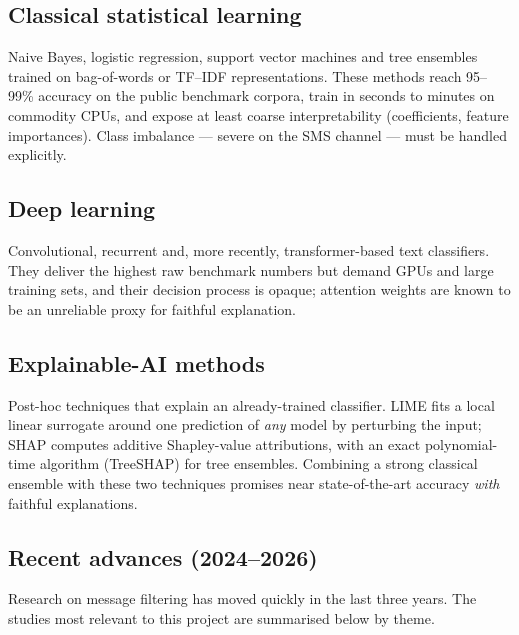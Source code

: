 \documentclass[12pt,a4paper]{report}
\begin{document}
\subsection{Classical statistical learning}

Naive Bayes, logistic regression, support vector machines and tree ensembles
trained on bag-of-words or TF--IDF representations. These methods reach
95--99\% accuracy on the public benchmark corpora, train in seconds to
minutes on commodity CPUs, and expose at least coarse interpretability
(coefficients, feature importances). Class imbalance --- severe on the SMS
channel --- must be handled explicitly.

\subsection{Deep learning}

Convolutional, recurrent and, more recently, transformer-based text
classifiers. They deliver the highest raw benchmark numbers but demand GPUs
and large training sets, and their decision process is opaque; attention
weights are known to be an unreliable proxy for faithful explanation.

\subsection{Explainable-AI methods}

Post-hoc techniques that explain an already-trained classifier. LIME fits a
local linear surrogate around one prediction of \emph{any} model by
perturbing the input; SHAP computes additive Shapley-value attributions, with
an exact polynomial-time algorithm (TreeSHAP) for tree ensembles. Combining a
strong classical ensemble with these two techniques promises near
state-of-the-art accuracy \emph{with} faithful explanations.

\subsection{Recent advances (2024--2026)}

Research on message filtering has moved quickly in the last three years. The
studies most relevant to this project are summarised below by theme.
\end{document}
